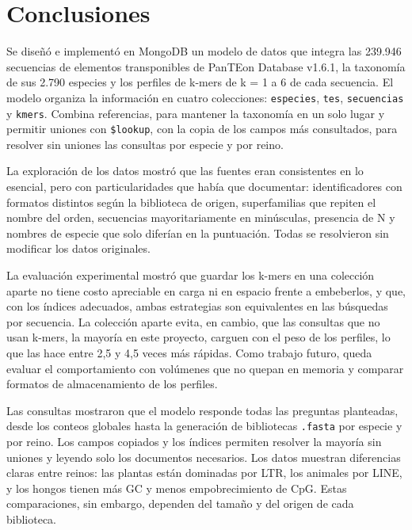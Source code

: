 \documentclass[unnumsec,namedate,webpdf,contemporary,large]{oup-authoring-template}
\begin{document}
\section{Conclusiones}

Se dise\~n\'o e implement\'o en MongoDB un modelo de datos que integra las 239.946 secuencias de elementos transponibles de PanTEon Database v1.6.1, la taxonom\'ia de sus 2.790 especies y los perfiles de k-mers de k = 1 a 6 de cada secuencia. El modelo organiza la informaci\'on en cuatro colecciones: \texttt{especies}, \texttt{tes}, \texttt{secuencias} y \texttt{kmers}. Combina referencias, para mantener la taxonom\'ia en un solo lugar y permitir uniones con \texttt{\$lookup}, con la copia de los campos m\'as consultados, para resolver sin uniones las consultas por especie y por reino.

La exploraci\'on de los datos mostr\'o que las fuentes eran consistentes en lo esencial, pero con particularidades que hab\'ia que documentar: identificadores con formatos distintos seg\'un la biblioteca de origen, superfamilias que repiten el nombre del orden, secuencias mayoritariamente en min\'usculas, presencia de N y nombres de especie que solo difer\'ian en la puntuaci\'on. Todas se resolvieron sin modificar los datos originales.

La evaluaci\'on experimental mostr\'o que guardar los k-mers en una colecci\'on aparte no tiene costo apreciable en carga ni en espacio frente a embeberlos, y que, con los \'indices adecuados, ambas estrategias son equivalentes en las b\'usquedas por secuencia. La colecci\'on aparte evita, en cambio, que las consultas que no usan k-mers, la mayor\'ia en este proyecto, carguen con el peso de los perfiles, lo que las hace entre 2,5 y 4,5 veces m\'as r\'apidas. Como trabajo futuro, queda evaluar el comportamiento con vol\'umenes que no quepan en memoria y comparar formatos de almacenamiento de los perfiles.

Las consultas mostraron que el modelo responde todas las preguntas planteadas, desde los conteos globales hasta la generaci\'on de bibliotecas \texttt{.fasta} por especie y por reino. Los campos copiados y los \'indices permiten resolver la mayor\'ia sin uniones y leyendo solo los documentos necesarios. Los datos muestran diferencias claras entre reinos: las plantas est\'an dominadas por LTR, los animales por LINE, y los hongos tienen m\'as GC y menos empobrecimiento de CpG. Estas comparaciones, sin embargo, dependen del tama\~no y del origen de cada biblioteca.
\end{document}
